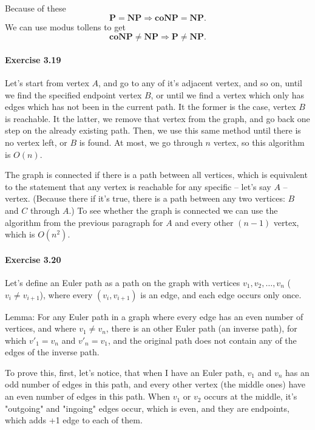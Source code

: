 \documentclass[a4paper,12pt]{article}
\newcommand{\exercise}[1]{\paragraph{Exercise #1}}
\begin{document}
    Because of these
    \begin{equation}
        \textbf{P} = \textbf{NP} \Rightarrow \textbf{coNP} = \textbf{NP} \textrm{.}
    \end{equation}
    We can use modus tollens to get
    \begin{equation}
        \textbf{coNP} \neq \textbf{NP} \Rightarrow \textbf{P} \neq \textbf{NP} \textrm{.}
    \end{equation}

    \exercise{3.19} Let's start from vertex $A$, and go to any of it's adjacent vertex, and so on, until we find the specified endpoint vertex $B$, or until we find a vertex which only has edges which has not been in the current path. It the former is the case, vertex $B$ is reachable. It the latter, we remove that vertex from the graph, and go back one step on the already existing path. Then, we use this same method until there is no vertex left, or $B$ is found. At most, we go through $n$ vertex, so this algorithm is $O(n)$.

    The graph is connected if there is a path between all vertices, which is equivalent to the statement that any vertex is reachable for any specific -- let's say $A$ -- vertex. (Because there if it's true, there is a path between any two vertices: $B$ and $C$ through $A$.) To see whether the graph is connected we can use the algorithm from the previous paragraph for $A$ and every other $(n-1)$ vertex, which is $O(n^2)$.

    \exercise{3.20} Let's define an Euler path as a path on the graph with vertices $v_1, v_2, \ldots, v_n$ ($v_i \neq v_{i+1}$), where every $(v_i, v_{i+1})$ is an edge, and each edge occurs only once.

    Lemma: For any Euler path in a graph where every edge has an even number of vertices, and where $v_1 \neq v_n$, there is an other Euler path (an inverse path), for which $v'_1 = v_n$ and $v'_n = v_1$, and the original path does not contain any of the edges of the inverse path.

    To prove this, first, let's notice, that when I have an Euler path, $v_1$ and $v_n$ has an odd number of edges in this path, and every other vertex (the middle ones) have an even number of edges in this path. When $v_1$ or $v_2$ occurs at the middle, it's "outgoing" and "ingoing" edges occur, which is even, and they are endpoints, which adds +1 edge to each of them.
\end{document}
